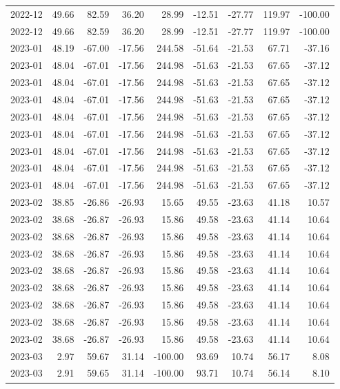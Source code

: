 \begin{table}[ht]
\begin{tabular}{lrrrrrrrr}
  2022-12 & 49.66 & 82.59 & 36.20 & 28.99 & -12.51 & -27.77 & 119.97 & -100.00 \\ 
  2022-12 & 49.66 & 82.59 & 36.20 & 28.99 & -12.51 & -27.77 & 119.97 & -100.00 \\ 
  2023-01 & 48.19 & -67.00 & -17.56 & 244.58 & -51.64 & -21.53 & 67.71 & -37.16 \\ 
  2023-01 & 48.04 & -67.01 & -17.56 & 244.98 & -51.63 & -21.53 & 67.65 & -37.12 \\ 
  2023-01 & 48.04 & -67.01 & -17.56 & 244.98 & -51.63 & -21.53 & 67.65 & -37.12 \\ 
  2023-01 & 48.04 & -67.01 & -17.56 & 244.98 & -51.63 & -21.53 & 67.65 & -37.12 \\ 
  2023-01 & 48.04 & -67.01 & -17.56 & 244.98 & -51.63 & -21.53 & 67.65 & -37.12 \\ 
  2023-01 & 48.04 & -67.01 & -17.56 & 244.98 & -51.63 & -21.53 & 67.65 & -37.12 \\ 
  2023-01 & 48.04 & -67.01 & -17.56 & 244.98 & -51.63 & -21.53 & 67.65 & -37.12 \\ 
  2023-01 & 48.04 & -67.01 & -17.56 & 244.98 & -51.63 & -21.53 & 67.65 & -37.12 \\ 
  2023-01 & 48.04 & -67.01 & -17.56 & 244.98 & -51.63 & -21.53 & 67.65 & -37.12 \\ 
  2023-02 & 38.85 & -26.86 & -26.93 & 15.65 & 49.55 & -23.63 & 41.18 & 10.57 \\ 
  2023-02 & 38.68 & -26.87 & -26.93 & 15.86 & 49.58 & -23.63 & 41.14 & 10.64 \\ 
  2023-02 & 38.68 & -26.87 & -26.93 & 15.86 & 49.58 & -23.63 & 41.14 & 10.64 \\ 
  2023-02 & 38.68 & -26.87 & -26.93 & 15.86 & 49.58 & -23.63 & 41.14 & 10.64 \\ 
  2023-02 & 38.68 & -26.87 & -26.93 & 15.86 & 49.58 & -23.63 & 41.14 & 10.64 \\ 
  2023-02 & 38.68 & -26.87 & -26.93 & 15.86 & 49.58 & -23.63 & 41.14 & 10.64 \\ 
  2023-02 & 38.68 & -26.87 & -26.93 & 15.86 & 49.58 & -23.63 & 41.14 & 10.64 \\ 
  2023-02 & 38.68 & -26.87 & -26.93 & 15.86 & 49.58 & -23.63 & 41.14 & 10.64 \\ 
  2023-02 & 38.68 & -26.87 & -26.93 & 15.86 & 49.58 & -23.63 & 41.14 & 10.64 \\ 
  2023-03 & 2.97 & 59.67 & 31.14 & -100.00 & 93.69 & 10.74 & 56.17 & 8.08 \\ 
  2023-03 & 2.91 & 59.65 & 31.14 & -100.00 & 93.71 & 10.74 & 56.14 & 8.10 \\ 

\end{tabular}
\end{table}
